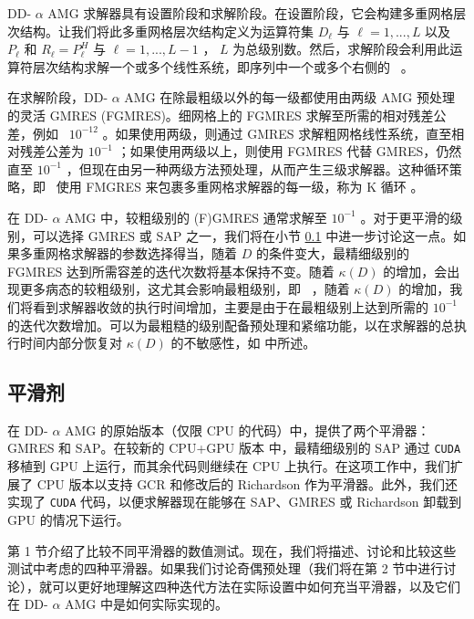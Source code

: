 \documentclass[5p,times,a4paper,fleqn]{cas-dc}
\begin{document}
DD-    $\alpha$    AMG 求解器具有设置阶段和求解阶段。在设置阶段，它会构建多重网格层次结构。让我们将此多重网格层次结构定义为运算符集    $D_{\ell}$    与    $\ell = 1, ..., L$    以及    $P_{\ell}$    和    $R_{\ell} = P_{\ell}^{H}$    与    $\ell = 1, ..., L-1$    ，   $L$    为总级别数。然后，求解阶段会利用此运算符层次结构求解一个或多个线性系统，即序列中一个或多个右侧的 \ 。  

在求解阶段，DD-    $\alpha$    AMG 在除最粗级以外的每一级都使用由两级 AMG 预处理的灵活 GMRES    \cite{saad2003iterative}    (FGMRES)。细网格上的 FGMRES 求解至所需的相对残差公差，例如 \     $10^{-12}$    。如果使用两级，则通过 GMRES 求解粗网格线性系统，直至相对残差公差为    $10^{-1}$    ；如果使用两级以上，则使用 FGMRES 代替 GMRES，仍然直至    $10^{-1}$    ，但现在由另一种两级方法预处理，从而产生三级求解器。这种循环策略，即 \  使用 FMGRES 来包裹多重网格求解器的每一级，称为 K 循环    \cite{notay2008recursive}    。  

在 DD-    $\alpha$    AMG 中，较粗级别的 (F)GMRES 通常求解至    $10^{-1}$    。对于更平滑的级别，可以选择 GMRES 或 SAP 之一，我们将在小节    \ref{subsect:smoothers_comp}    中进一步讨论这一点。如果多重网格求解器的参数选择得当，随着    $D$    的条件变大，最精细级别的 FGMRES 达到所需容差的迭代次数将基本保持不变。随着    $\kappa(D)$    的增加，会出现更多病态的较粗级别，这尤其会影响最粗级别，即 \ ，随着    $\kappa(D)$    的增加，我们将看到求解器收敛的执行时间增加，主要是由于在最粗级别上达到所需的    $10^{-1}$    的迭代次数增加。可以为最粗糙的级别配备预处理和紧缩功能，以在求解器的总执行时间内部分恢复对    $\kappa(D)$    的不敏感性，如    \cite{espinoza2023coarsest}    中所述。  

   \subsection{平滑剂  }       \label{subsect:smoothers_comp}     

在 DD-    $\alpha$    AMG    \cite{wuppertalDDalphaAMG}    的原始版本（仅限 CPU 的代码）中，提供了两个平滑器：GMRES 和 SAP。在较新的 CPU+GPU 版本    \cite{wuppertalGPUDDalphaAMG}    中，最精细级别的 SAP 通过    \texttt{CUDA}    移植到 GPU 上运行，而其余代码则继续在 CPU 上执行。在这项工作中，我们扩展了 CPU 版本以支持 GCR 和修改后的 Richardson 作为平滑器。此外，我们还实现了    \texttt{CUDA}    代码，以便求解器现在能够在 SAP、GMRES 或 Richardson 卸载到 GPU 的情况下运行。  

第 1 节介绍了比较不同平滑器的数值测试。现在，我们将描述、讨论和比较这些测试中考虑的四种平滑器。如果我们讨论奇偶预处理（我们将在第 2 节中进行讨论），就可以更好地理解这四种迭代方法在实际设置中如何充当平滑器，以及它们在 DD-   $\alpha$    AMG 中是如何实际实现的。  
\end{document}
